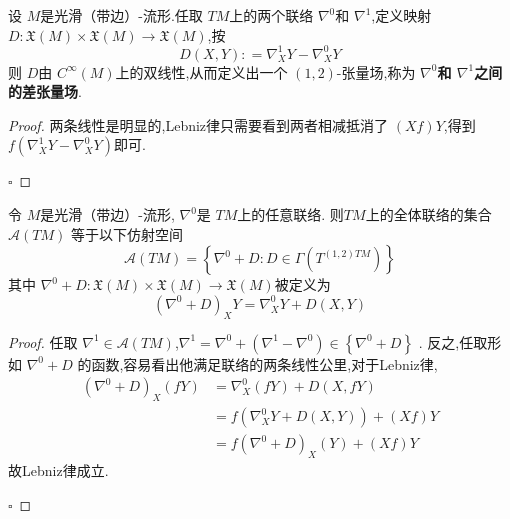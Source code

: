 \documentclass[../../几何与拓扑.tex]{subfiles}
\begin{document}
\begin{proposition}
    设 \(  M  \)是光滑（带边）-流形.任取 \(  TM  \)上的两个联络 \(   \nabla ^{0}  \)和 \(   \nabla ^{1}  \),定义映射
     \(  D: \mathfrak{X}\left( M \right)\times \mathfrak{X}\left( M \right)\to \mathfrak{X}\left( M \right)     \),按 \[
     D\left( X,Y \right): =   \nabla _{X}^{1}Y-  \nabla _{X}^{0}Y 
     \]则 \(  D  \)由 \(  C^{\infty}\left( M \right)   \)上的双线性,从而定义出一个 \(  \left( 1,2 \right)   \)-张量场,称为\textbf{ \(   \nabla ^{0}  \)和 \(   \nabla ^{1}  \)之间的差张量场}.          
\end{proposition}

\begin{proof}
    两条线性是明显的,Lebniz律只需要看到两者相减抵消了 \(  \left( Xf \right)Y   \),得到 \(  f\left(  \nabla _{X}^{1}Y- \nabla _{X}^{0}Y \right)   \)即可.  

    \hfill $\square$
\end{proof}

\begin{theorem}
    令 \(  M  \)是光滑（带边）-流形, \(   \nabla ^{0}  \)是 \(  TM  \)上的任意联络.
    则\(  TM  \)上的全体联络的集合 \(  \mathscr{A}\left( TM \right)   \)     等于以下仿射空间 \[
    \mathscr{A}\left( TM \right)  =  \left\{  \nabla ^{0}+ D: D \in  \Gamma \left( T^{\left( 1,2 \right)TM } \right)  \right\}
    \]其中 \(   \nabla ^{0}+ D: \mathfrak{X}\left( M \right)\times \mathfrak{X}\left( M \right)\to \mathfrak{X}\left( M \right)     \)被定义为 \[
    \left(  \nabla ^{0}+ D \right) _{X}Y =   \nabla _{X}^{0}Y+ D\left( X,Y \right) 
    \] 
\end{theorem}
\begin{proof}
    任取 \(   \nabla ^{1} \in \mathscr{A}\left( TM \right)   \),\(   \nabla ^{1} =  \nabla ^{0}+  \left(  \nabla ^{1}- \nabla ^{0} \right)   \in \left\{  \nabla ^{0}+ D \right\}\)  .
    反之,任取形如 \(   \nabla ^{0}+ D  \) 的函数,容易看出他满足联络的两条线性公里,对于Lebniz律, \[
    \begin{aligned}
    \left(  \nabla ^{0}+ D \right)_{X}\left( fY \right)& =    \nabla _{X}^{0}\left( fY \right)+ D\left( X,fY \right)\\ 
     & = f\left(  \nabla _{X}^{0}Y+ D\left( X,Y \right)  \right)+  \left( Xf \right)Y\\ 
      & = f\left(  \nabla ^{0}+ D \right)_{X}\left( Y \right)+ \left( Xf \right)Y         
    \end{aligned}
    \]故Lebniz律成立.

    \hfill $\square$
\end{proof}
\end{document}
